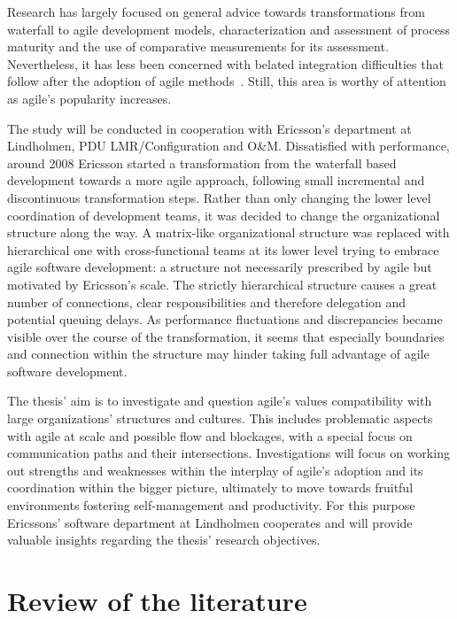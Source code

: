 \documentclass[paper=a4, fontsize=11pt]{scrartcl}
\numberwithin{equation}{section}		%
\numberwithin{figure}{section}			%
\numberwithin{table}{section}			%
\begin{document}
Research has largely focused on general advice towards transformations from waterfall to agile development models, characterization and assessment of process maturity and the use of comparative measurements for its assessment. Nevertheless, it has less been concerned with belated integration difficulties that follow after the adoption of agile methods~\citep{ivari2011orgagile}. Still, this area is worthy of attention as agile's popularity increases.

The study will be conducted in cooperation with Ericsson's department at Lindholmen, PDU LMR/Configuration and O\&M. Dissatisfied with performance, around 2008 Ericsson started a transformation from the waterfall based development towards a more agile approach, following small incremental and discontinuous transformation steps. Rather than only changing the lower level coordination of development teams, it was decided to change the organizational structure along the way. A matrix-like organizational structure was replaced with hierarchical one with cross-functional teams at its lower level trying to embrace agile software development: a structure not necessarily prescribed by agile but motivated by Ericsson's scale.
The strictly hierarchical structure causes a great number of connections, clear responsibilities and therefore delegation and potential queuing delays. As performance fluctuations and discrepancies became visible over the course of the transformation, it seems that especially boundaries and connection within the structure may hinder taking full advantage of agile software development.

The thesis' aim is to investigate and question agile's values compatibility with large organizations' structures and cultures. This includes problematic aspects with agile at scale and possible flow and blockages, with a special focus on communication paths and their intersections. Investigations will focus on working out strengths and weaknesses within the interplay of agile's adoption and its coordination within the bigger picture, ultimately to move towards fruitful environments fostering self-management and productivity. For this purpose Ericssons' software department at Lindholmen cooperates and will provide valuable insights regarding the thesis' research objectives.

\section{Review of the literature}
\end{document}

